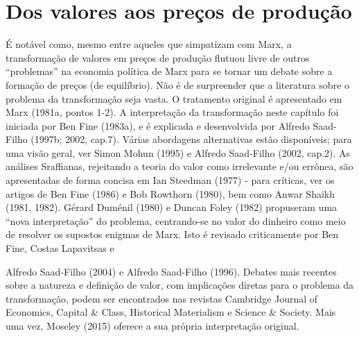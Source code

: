 \section{Dos valores aos preços de produção}
 \par 
É notável como, mesmo entre aqueles que simpatizam com Marx, a transformação de valores em preços de produção flutuou livre de outros “problemas” na economia política de Marx para se tornar um debate sobre a formação de preços (de equilíbrio). Não é de surpreender que a literatura sobre o problema da transformação seja vasta. O tratamento original é apresentado em Marx (1981a, pontos 1-2). A interpretação da transformação neste capítulo foi iniciada por Ben Fine (1983a), e é explicada e desenvolvida por Alfredo Saad-Filho (1997b; 2002, cap.{\color{blue}7}). Várias abordagens alternativas estão disponíveis; para uma visão geral, ver Simon Mohun (1995) e Alfredo Saad-Filho (2002, cap.{\color{blue}2}). As análises Sraffianas, rejeitando a teoria do valor como irrelevante e/ou errônea, são apresentadas de forma concisa em Ian Steedman (1977) - para críticas, ver os artigos de Ben Fine (1986) e Bob Rowthorn (1980), bem como Anwar Shaikh (1981, 1982). Gérard Duménil (1980) e Duncan Foley (1982) propuseram uma “nova interpretação” do problema, centrando-se no valor do dinheiro como meio de resolver os supostos enigmas de Marx. Isto é revisado criticamente por Ben Fine, Costas Lapavitsas e
 \par 
Alfredo Saad-Filho (2004) e Alfredo Saad-Filho (1996). Debates mais recentes sobre a natureza e definição de valor, com implicações diretas para o problema da transformação, podem ser encontrados nas revistas Cambridge Journal of Economics, Capital & Class, Historical Materialism e Science & Society. Mais uma vez, Moseley (2015) oferece a sua própria interpretação original.